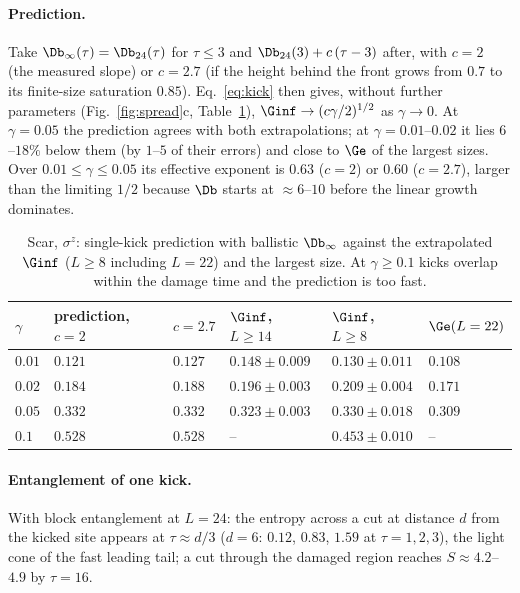 \paragraph{Prediction.} Take $\Db_\infty(\tau) = \Db_{24}(\tau)$ for $\tau \le 3$ and $\Db_{24}(3) + c\,(\tau - 3)$ after, with $c = 2$ (the measured slope) or $c = 2.7$ (if the height behind the front grows from $0.7$ to its finite-size saturation $0.85$). Eq.~\eqref{eq:kick} then gives, without further parameters (Fig.~\ref{fig:spread}c, Table~\ref{tab:ballistic}), $\Ginf \to (c\gamma/2)^{1/2}$ as $\gamma \to 0$. At $\gamma = 0.05$ the prediction agrees with both extrapolations; at $\gamma = 0.01$--$0.02$ it lies $6$--$18\%$ below them (by $1$--$5$ of their errors) and close to $\Ge$ of the largest sizes. Over $0.01 \le \gamma \le 0.05$ its effective exponent is $0.63$ ($c = 2$) or $0.60$ ($c = 2.7$), larger than the limiting $1/2$ because $\Db$ starts at $\approx 6$--$10$ before the linear growth dominates.

\begin{table}[H]
\centering
\small
\begin{tabular}{llllll}
\toprule
$\gamma$ & prediction, $c = 2$ & $c = 2.7$ & $\Ginf$, $L \ge 14$ & $\Ginf$, $L \ge 8$ & $\Ge(L = 22)$ \\
\midrule
$0.01$ & $0.121$ & $0.127$ & $0.148 \pm 0.009$ & $0.130 \pm 0.011$ & $0.108$ \\
$0.02$ & $0.184$ & $0.188$ & $0.196 \pm 0.003$ & $0.209 \pm 0.004$ & $0.171$ \\
$0.05$ & $0.332$ & $0.332$ & $0.323 \pm 0.003$ & $0.330 \pm 0.018$ & $0.309$ \\
$0.1$ & $0.528$ & $0.528$ & -- & $0.453 \pm 0.010$ & -- \\
\bottomrule
\end{tabular}
\caption{Scar, $\sigma^z$: single-kick prediction with ballistic $\Db_\infty$ against the extrapolated $\Ginf$ ($L \ge 8$ including $L = 22$) and the largest size. At $\gamma \ge 0.1$ kicks overlap within the damage time and the prediction is too fast.}
\label{tab:ballistic}
\end{table}

\paragraph{Entanglement of one kick.} With block entanglement at $L = 24$: the entropy across a cut at distance $d$ from the kicked site appears at $\tau \approx d/3$ ($d = 6$: $0.12$, $0.83$, $1.59$ at $\tau = 1, 2, 3$), the light cone of the fast leading tail; a cut through the damaged region reaches $S \approx 4.2$--$4.9$ by $\tau = 16$.

